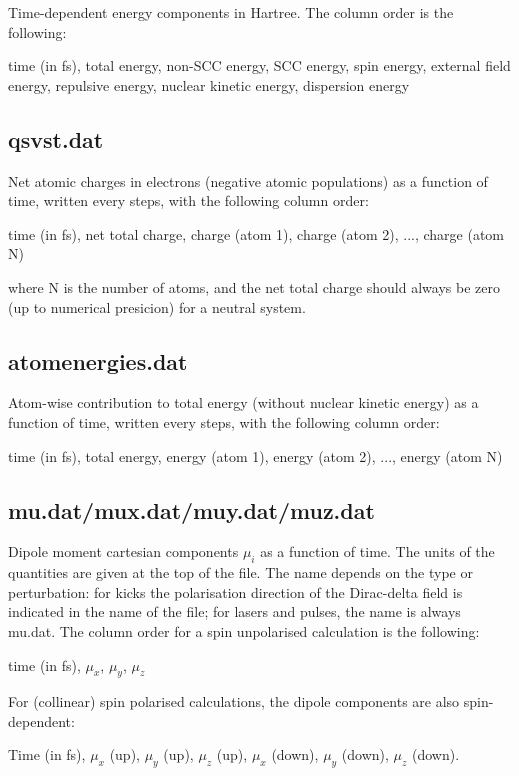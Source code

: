 Time-dependent energy components in Hartree. The column order is the
following:

time (in fs), total energy, non-SCC energy, SCC energy, spin energy,
external field energy, repulsive energy, nuclear kinetic energy,
dispersion energy

\subsection{qsvst.dat}

Net atomic charges in electrons (negative atomic populations) as a
function of time, written every  steps, with the
following column order:

time (in fs), net total charge, charge (atom 1), charge (atom 2), ...,
charge (atom N)

where N is the number of atoms, and the net total charge should always
be zero (up to numerical presicion) for a neutral system.

\subsection{atomenergies.dat}

Atom-wise contribution to total energy (without nuclear kinetic energy)
as a function of time, written every  steps, with the
following column order:

time (in fs), total energy, energy (atom 1), energy (atom 2), ...,
energy (atom N)

\subsection{mu.dat/mux.dat/muy.dat/muz.dat}

Dipole moment cartesian components $\mu_i$ as a function of time. The
units of the quantities are given at the top of the file. The name
depends on the type or perturbation: for kicks the polarisation
direction of the Dirac-delta field is indicated in the name of the
file; for lasers and pulses, the name is always mu.dat. The column
order for a spin unpolarised calculation is the following:

time (in fs), $\mu_x$, $\mu_y$, $\mu_z$

For (collinear) spin polarised calculations, the dipole components are
also spin-dependent:

Time (in fs), $\mu_x$ (up), $\mu_y$ (up), $\mu_z$ (up), $\mu_x$
(down), $\mu_y$ (down), $\mu_z$ (down).

